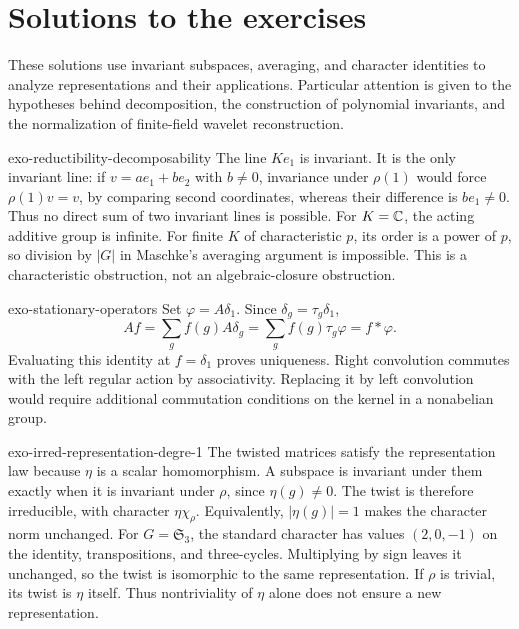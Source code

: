 \clearpage
\section{Solutions to the exercises}
\label{sec-solutions-7-representations}

These solutions use invariant subspaces, averaging, and character identities
to analyze representations and their applications. Particular attention is
given to the hypotheses behind decomposition, the construction of polynomial
invariants, and the normalization of finite-field wavelet reconstruction.

\begin{correction}{exo-reductibility-decomposability}
The line $Ke_1$ is invariant. It is the only invariant line: if
$v=ae_1+be_2$ with $b\ne0$, invariance under $\rho(1)$ would force
$\rho(1)v=v$, by comparing second coordinates, whereas their difference
is $be_1\ne0$. Thus no direct sum of two invariant lines is possible.
For $K=\mathbb{C}$, the acting additive group is infinite. For finite $K$ of
characteristic $p$, its order is a power of $p$, so division by $|G|$
in Maschke's averaging argument is impossible. This is a characteristic
obstruction, not an algebraic-closure obstruction.
\end{correction}

\begin{correction}{exo-stationary-operators}
Set $\varphi=A\delta_1$. Since $\delta_g=\tau_g\delta_1$,
\[
 Af=\sum_g f(g)A\delta_g=\sum_g f(g)\tau_g\varphi=f*\varphi.
\]
Evaluating this identity at $f=\delta_1$ proves uniqueness. Right
convolution commutes with the left regular action by associativity.
Replacing it by left convolution would require additional commutation
conditions on the kernel in a nonabelian group.
\end{correction}

\begin{correction}{exo-irred-representation-degre-1}
The twisted matrices satisfy the representation law because $\eta$ is
a scalar homomorphism. A subspace is invariant under them exactly when
it is invariant under $\rho$, since $\eta(g)\ne0$. The twist is therefore
irreducible, with character $\eta\chi_\rho$. Equivalently,
$|\eta(g)|=1$ makes the character norm unchanged.
For $G=\mathfrak S_3$, the standard character has values $(2,0,-1)$
on the identity, transpositions, and three-cycles. Multiplying by sign
leaves it unchanged, so the twist is isomorphic to the same representation.
If $\rho$ is trivial, its twist is $\eta$ itself. Thus nontriviality of
$\eta$ alone does not ensure a new representation.
\end{correction}


